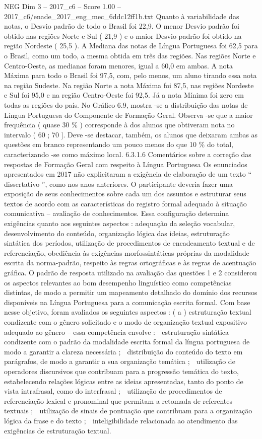 \begin{textsample}{NEG Dim 3 – 2017\_c6 – Score 1.00 – 2017\_c6/enade\_2017\_eng\_mec\_6ddc12ff1b.txt}
Quanto à variabilidade das notas, o Desvio padrão de todo o Brasil foi 22,9.
O menor Desvio padrão foi obtido nas regiões Norte e Sul ( 21,9 ) e o maior Desvio padrão foi obtido na região Nordeste ( 25,5 ).
A Mediana das notas de Língua Portuguesa foi 62,5 para o Brasil, como um todo, a mesma obtida em três das regiões.
Nas regiões Norte e Centro-Oeste, as medianas foram menores, igual a 60,0 em ambas.
A nota Máxima para todo o Brasil foi 97,5, com, pelo menos, um aluno tirando essa nota na região Sudeste.
Na região Norte a nota Máxima foi 87,5, nas regiões Nordeste e Sul foi 95,0 e na região Centro-Oeste foi 92,5.
Já a nota Mínima foi zero em todas as regiões do país.
No Gráfico 6.9, mostra -se a distribuição das notas de Língua Portuguesa do Componente de Formação Geral.
Observa -se que a maior frequência ( quase 30 \% ) corresponde à dos alunos que obtiveram nota no intervalo ( 60 ; 70 ].
Deve -se destacar, também, os alunos que deixaram ambas as questões em branco representando um pouco menos do que 10 \% do total, caracterizando -se como máximo local. 6.3.1.6 Comentários sobre a correção das respostas de Formação Geral com respeito à Língua Portuguesa Os enunciados apresentados em 2017 não explicitaram a exigência de elaboração de um texto “ dissertativo ”, como nos anos anteriores.
O participante deveria fazer uma exposição de seus conhecimentos sobre cada um dos assuntos e estruturar seus textos de acordo com as características do registro formal adequado à situação comunicativa – avaliação de conhecimentos.
Essa configuração determina exigências quanto aos seguintes aspectos : adequação da seleção vocabular, desenvolvimento do conteúdo, organização lógica das ideias, estruturação sintática dos períodos, utilização de procedimentos de encadeamento textual e de referenciação, obediência às exigências morfossintáticas próprias da modalidade escrita da norma-padrão, respeito às regras ortográficas e às regras de acentuação gráfica.
O padrão de resposta utilizado na avaliação das questões 1 e 2 considerou os aspectos relevantes ao bom desempenho linguístico como competências distintas, de modo a permitir um mapeamento detalhado do domínio dos recursos disponíveis na Língua Portuguesa para a comunicação escrita formal.
Com base nesse objetivo, foram avaliados os seguintes aspectos : ( a ) estruturação textual condizente com o gênero solicitado e o modo de organização textual expositivo adequado ao gênero – essa competência envolve :  estruturação sintática condizente com o padrão da modalidade escrita formal da língua portuguesa de modo a garantir a clareza necessária ;  distribuição do conteúdo do texto em parágrafos, de modo a garantir a sua organização temática ;  utilização de operadores discursivos que contribuam para a progressão temática do texto, estabelecendo relações lógicas entre as ideias apresentadas, tanto do ponto de vista intrafrasal, como do interfrasal ;  utilização de procedimentos de referenciação lexical e pronominal que permitam a retomada de referentes textuais ;  utilização de sinais de pontuação que contribuam para a organização lógica da frase e do texto ;  inteligibilidade relacionada ao atendimento das exigências de estruturação textual.

\end{textsample}

